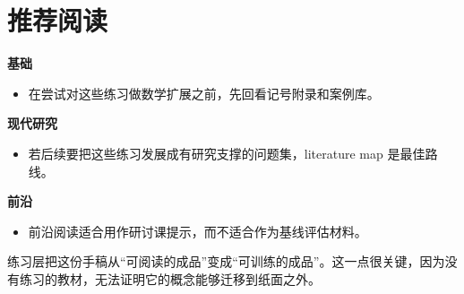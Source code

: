 \section{推荐阅读}

\begin{readingbox}
\textbf{基础}
\begin{itemize}[nosep]
  \item 在尝试对这些练习做数学扩展之前，先回看记号附录和案例库。
\end{itemize}
\textbf{现代研究}
\begin{itemize}[nosep]
  \item 若后续要把这些练习发展成有研究支撑的问题集，literature map 是最佳路线。
\end{itemize}
\textbf{前沿}
\begin{itemize}[nosep]
  \item 前沿阅读适合用作研讨课提示，而不适合作为基线评估材料。
\end{itemize}
\end{readingbox}

\begin{summarybox}
练习层把这份手稿从“可阅读的成品”变成“可训练的成品”。这一点很关键，因为没有练习的教材，无法证明它的概念能够迁移到纸面之外。
\end{summarybox}